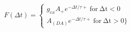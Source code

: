  $F(\Delta t) =  \begin{cases} g_{ex} A_{+} e^{−\Delta t/τ+}\:\mathrm{for\:\Delta t <0}\\A_(DA) e^{−\Delta t/τ+}\:\mathrm{for\:\Delta t > 0}\} \end{cases}$
 